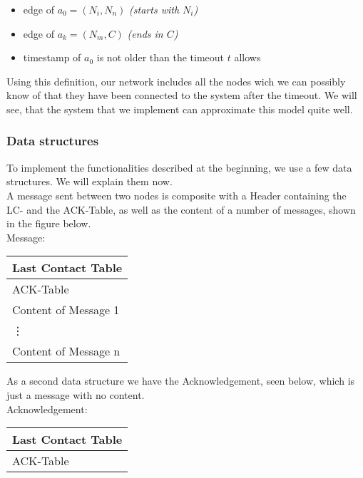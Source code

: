 	\begin{itemize}
	\item edge of $a_0 = (N_{i},N_{n}) $ \qquad \textit{(starts with $N_i$)}  \\
	\item edge of $a_k = (N_{m},C)$ \qquad \textit{ (ends in $C$)} \\
	\item timestamp of $a_0$ is not older than the timeout $t$ allows\\
	\end{itemize}
	Using this definition, our network includes all the nodes wich we can possibly know of that they have been connected to the system after the timeout. We will see, that the system that we implement can approximate this model quite well.
	\subsubsection{Data structures}
	To implement the functionalities described at the beginning, we use a few data structures. We will explain them now. \\

	A message sent between two nodes is composite with a Header containing the LC- and the ACK-Table, as well as the content of a number of messages, shown in the figure below. \\

	Message:
		\begin{center}
			\begin{tabular}{ | l |}
				\hline
				Last Contact Table \\ \hline
				ACK-Table \\ \hline
				Content of Message 1\\ \hline
				\vdots\\ \hline
				Content of Message n\\ \hline
			\end{tabular}
		\end{center}


As a second data structure we have the Acknowledgement, seen below, which is just a message with no content. \\


	Acknowledgement:
		\begin{center}
			\begin{tabular}{ | l |}
				\hline
				Last Contact Table \\ \hline
				ACK-Table \\ \hline
			\end{tabular}
		\end{center}
			
